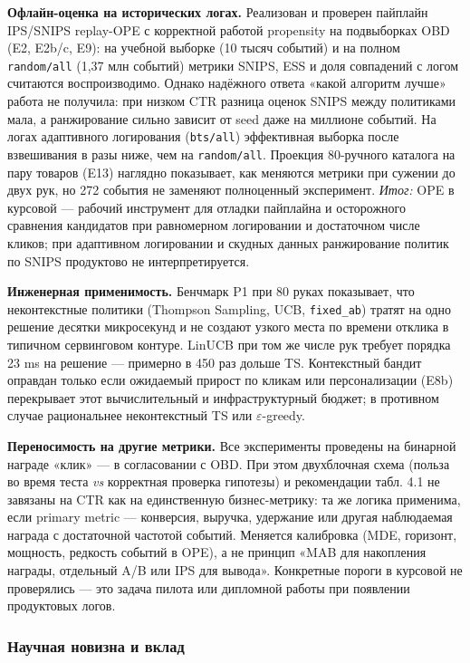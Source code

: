 \textbf{Офлайн-оценка на исторических логах.} Реализован и проверен пайплайн IPS/SNIPS replay-OPE с корректной работой propensity на подвыборках OBD (E2, E2b/c, E9): на учебной выборке (10 тысяч событий) и на полном \texttt{random/all} (1,37 млн событий) метрики SNIPS, ESS и доля совпадений с логом считаются воспроизводимо. Однако надёжного ответа «какой алгоритм лучше» работа не получила: при низком CTR разница оценок SNIPS между политиками мала, а ранжирование сильно зависит от seed даже на миллионе событий. На логах адаптивного логирования (\texttt{bts/all}) эффективная выборка после взвешивания в разы ниже, чем на \texttt{random/all}. Проекция 80-ручного каталога на пару товаров (E13) наглядно показывает, как меняются метрики при сужении до двух рук, но 272 события не заменяют полноценный эксперимент. \emph{Итог:} OPE в курсовой --- рабочий инструмент для отладки пайплайна и осторожного сравнения кандидатов при равномерном логировании и достаточном числе кликов; при адаптивном логировании и скудных данных ранжирование политик по SNIPS продуктово не интерпретируется.

\textbf{Инженерная применимость.} Бенчмарк P1 при 80 руках показывает, что неконтекстные политики (Thompson Sampling, UCB, \texttt{fixed\_ab}) тратят на одно решение десятки микросекунд и не создают узкого места по времени отклика в типичном сервинговом контуре. LinUCB при том же числе рук требует порядка 23 ms на решение --- примерно в 450 раз дольше TS. Контекстный бандит оправдан только если ожидаемый прирост по кликам или персонализации (E8b) перекрывает этот вычислительный и инфраструктурный бюджет; в противном случае рациональнее неконтекстный TS или $\varepsilon$-greedy.

\textbf{Переносимость на другие метрики.} Все эксперименты проведены на бинарной награде «клик» --- в согласовании с OBD. При этом двухблочная схема (польза во время теста \emph{vs} корректная проверка гипотезы) и рекомендации табл. 4.1 не завязаны на CTR как на единственную бизнес-метрику: та же логика применима, если primary metric --- конверсия, выручка, удержание или другая наблюдаемая награда с достаточной частотой событий. Меняется калибровка (MDE, горизонт, мощность, редкость событий в OPE), а не принцип «MAB для накопления награды, отдельный A/B или IPS для вывода». Конкретные пороги в курсовой не проверялись --- это задача пилота или дипломной работы при появлении продуктовых логов.

\subsubsection{Научная новизна и вклад}\label{ux43dux430ux443ux447ux43dux430ux44f-ux43dux43eux432ux438ux437ux43dux430-ux438-ux432ux43aux43bux430ux434}

